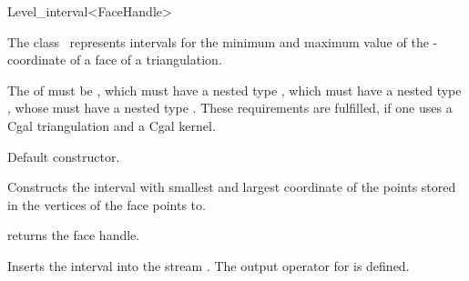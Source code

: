 \begin{ccRefClass} {Level_interval<FaceHandle>}

\ccDefinition

The class \ccClassTemplateName\ represents intervals for the minimum and
maximum value of the -coordinate of a face of a triangulation.




\ccThreeToTwo



\ccRequirements
The  of   must be , which must have a 
nested type , which must have a nested type ,
whose  must have a nested type .
These requirements are fulfilled, if one uses a {\sc Cgal} triangulation
and a {\sc Cgal} kernel.

\ccTypes


\ccCreation
{}

{Default constructor.}

{Constructs the interval with smallest and largest  coordinate of the points
stored in the vertices of the face  points to.}

\ccOperations


{returns the face handle.}


{Inserts the interval  into the stream .
\ccPrecond The output operator for  is defined.}

\ccIsModel
{}

\end{ccRefClass}

